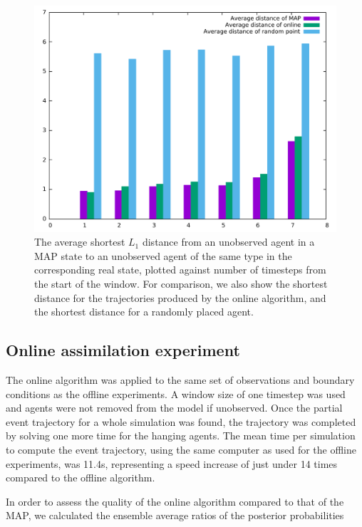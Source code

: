 \documentclass{article}
\begin{document}
\begin{figure}
\begin{center}
\includegraphics[width = 12cm]{distances2.pdf}
\end{center}
\caption{The average shortest $L_1$ distance from an unobserved agent in a MAP state to an unobserved agent of the same type in the corresponding real state, plotted against number of timesteps from the start of the window. For comparison, we also show the shortest distance for the trajectories produced by the online algorithm, and the shortest distance for a randomly placed agent.}
\label{distance}
\end{figure}

\subsection{Online assimilation experiment}

The online algorithm was applied to the same set of observations and boundary conditions as the offline experiments. A window size of one timestep was used and agents were not removed from the model if unobserved. Once the partial event trajectory for a whole simulation was found, the trajectory was completed by solving one more time for the hanging agents. The mean time per simulation to compute the event trajectory, using the same computer as used for the offline experiments, was 11.4s, representing a speed increase of just under 14 times compared to the offline algorithm.

In order to assess the quality of the online algorithm compared to that of the MAP, we calculated the ensemble average ratios of the posterior probabilities
\end{document}
